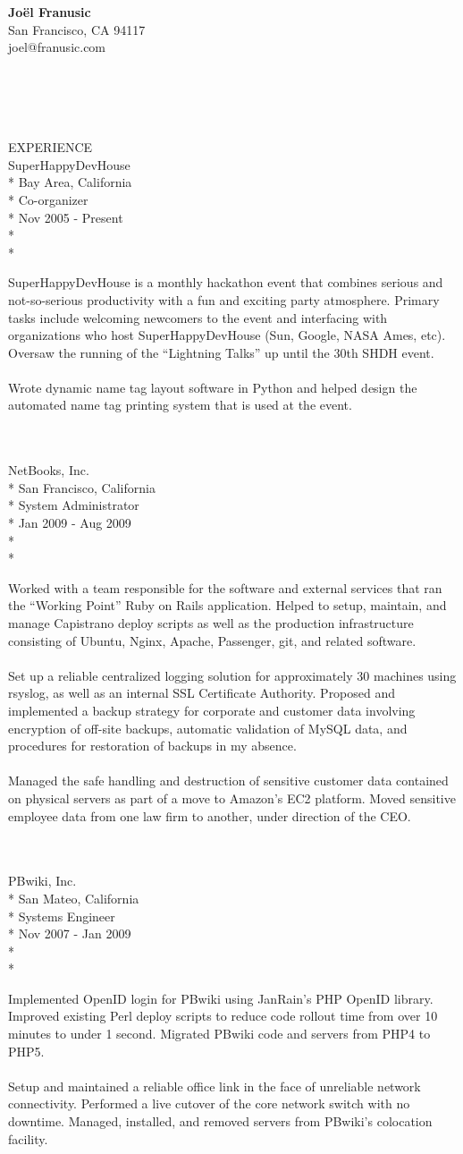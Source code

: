 \documentclass[10pt]{article}
\newcommand{\work}[5]{ 
#1\\*
#3\\*
#4\\*
#2\\*
\\*
\makebox[1in][l]{}
\begin{minipage}[t]{5.50in}\small{#5}\end{minipage}
\\
\\
}
\newcommand{\heading}[1]{
#1
\\
}
\newcommand{\address}[1]{
\hfill{}\begin{minipage}[t]{2.00in}#1\end{minipage}
\\
}
\begin{document}
\address{\textbf{Jo\"el Franusic}\\ San Francisco, CA 94117\\ joel@franusic.com}
\\
\\
\\
\heading{EXPERIENCE}

\work{SuperHappyDevHouse}{Nov 2005 - Present}{Bay Area, California}{Co-organizer}{
SuperHappyDevHouse is a monthly hackathon event that combines serious and not-so-serious productivity with a fun and exciting party atmosphere. Primary tasks include welcoming newcomers to the event and interfacing with organizations who host SuperHappyDevHouse (Sun, Google, NASA Ames, etc).
Oversaw the running of the ``Lightning Talks'' up until the 30th SHDH event.
\\
\\
Wrote dynamic name tag layout software in Python and helped design the automated name tag printing system that is used at the event.
}

\work{NetBooks, Inc.}{Jan 2009 - Aug 2009}{San Francisco, California}{System Administrator}{
Worked with a team responsible for the software and external services that ran the ``Working Point'' Ruby on Rails application. Helped to setup, maintain, and manage Capistrano deploy scripts as well as the production infrastructure consisting of Ubuntu, Nginx, Apache, Passenger, git, and related software.
\\
\\
Set up a reliable centralized logging solution for approximately 30 machines using rsyslog, as well as an internal SSL Certificate Authority. Proposed and implemented a backup strategy for corporate and customer data involving encryption of off-site backups, automatic validation of MySQL data, and procedures for restoration of backups in my absence.
\\
\\
Managed the safe handling and destruction of sensitive customer data contained on physical servers as part of a move to Amazon's EC2 platform. Moved sensitive employee data from one law firm to another, under direction of the CEO.
}

\work{PBwiki, Inc.}{Nov 2007 - Jan 2009}{San Mateo, California}{Systems Engineer}{
Implemented OpenID login for PBwiki using JanRain's PHP OpenID library. 
Improved existing Perl deploy scripts to reduce code rollout time from over 10 minutes to under 1 second.
Migrated PBwiki code and servers from PHP4 to PHP5. 
\\
\\
Setup and maintained a reliable office link in the face of unreliable network connectivity. 
Performed a live cutover of the core network switch with no downtime. 
Managed, installed, and removed servers from PBwiki's colocation facility. 
}
\end{document}
